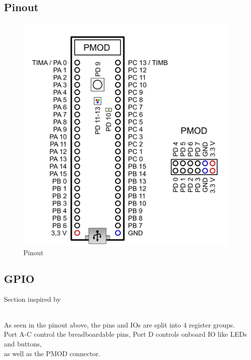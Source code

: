 \subsection{Pinout} \label{section:pinout}
\begin{figure}[h]
    \begin{center}
        \includegraphics[scale=0.23]{assets/pinout.png}
    \end{center}
    \caption{Pinout \cite{cmod-a7-pinout}}
\end{figure}

\subsection{GPIO} 
\begin{footnotesize}Section inspired by \cite{atmega328p-gpio} \end{footnotesize}\\
As seen in the pinout above, the pins and IOs are split into 4 register groups.\\
Port A-C control the breadboardable pins, Port D controls onboard IO like LEDs and buttons,\\
as well as the PMOD connector.\\

